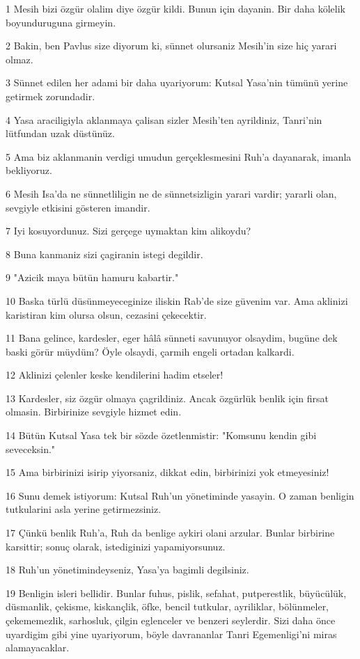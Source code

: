 \par 1 Mesih bizi özgür olalim diye özgür kildi. Bunun için dayanin. Bir daha kölelik boyunduruguna girmeyin.
\par 2 Bakin, ben Pavlus size diyorum ki, sünnet olursaniz Mesih'in size hiç yarari olmaz.
\par 3 Sünnet edilen her adami bir daha uyariyorum: Kutsal Yasa'nin tümünü yerine getirmek zorundadir.
\par 4 Yasa araciligiyla aklanmaya çalisan sizler Mesih'ten ayrildiniz, Tanri'nin lütfundan uzak düstünüz.
\par 5 Ama biz aklanmanin verdigi umudun gerçeklesmesini Ruh'a dayanarak, imanla bekliyoruz.
\par 6 Mesih Isa'da ne sünnetliligin ne de sünnetsizligin yarari vardir; yararli olan, sevgiyle etkisini gösteren imandir.
\par 7 Iyi kosuyordunuz. Sizi gerçege uymaktan kim alikoydu?
\par 8 Buna kanmaniz sizi çagiranin istegi degildir.
\par 9 "Azicik maya bütün hamuru kabartir."
\par 10 Baska türlü düsünmeyeceginize iliskin Rab'de size güvenim var. Ama aklinizi karistiran kim olursa olsun, cezasini çekecektir.
\par 11 Bana gelince, kardesler, eger hâlâ sünneti savunuyor olsaydim, bugüne dek baski görür müydüm? Öyle olsaydi, çarmih engeli ortadan kalkardi.
\par 12 Aklinizi çelenler keske kendilerini hadim etseler!
\par 13 Kardesler, siz özgür olmaya çagrildiniz. Ancak özgürlük benlik için firsat olmasin. Birbirinize sevgiyle hizmet edin.
\par 14 Bütün Kutsal Yasa tek bir sözde özetlenmistir: "Komsunu kendin gibi seveceksin."
\par 15 Ama birbirinizi isirip yiyorsaniz, dikkat edin, birbirinizi yok etmeyesiniz!
\par 16 Sunu demek istiyorum: Kutsal Ruh'un yönetiminde yasayin. O zaman benligin tutkularini asla yerine getirmezsiniz.
\par 17 Çünkü benlik Ruh'a, Ruh da benlige aykiri olani arzular. Bunlar birbirine karsittir; sonuç olarak, istediginizi yapamiyorsunuz.
\par 18 Ruh'un yönetimindeyseniz, Yasa'ya bagimli degilsiniz.
\par 19 Benligin isleri bellidir. Bunlar fuhus, pislik, sefahat, putperestlik, büyücülük, düsmanlik, çekisme, kiskançlik, öfke, bencil tutkular, ayriliklar, bölünmeler, çekememezlik, sarhosluk, çilgin eglenceler ve benzeri seylerdir. Sizi daha önce uyardigim gibi yine uyariyorum, böyle davrananlar Tanri Egemenligi'ni miras alamayacaklar.
